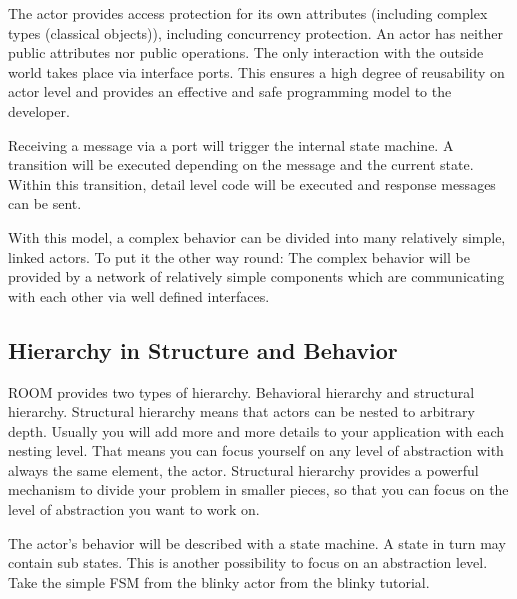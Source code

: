 
The actor provides access protection for its own attributes (including complex types (classical objects)), 
including concurrency protection. An actor has neither public attributes nor public operations. The only 
interaction with the outside world takes place via interface ports. This ensures a high degree of 
reusability on actor level and provides an effective and safe programming model to the developer. 

Receiving a message via a port will trigger the internal state machine. A transition will be executed 
depending on the message and the current state. Within this transition, detail level code will be executed 
and response messages can be sent.


With this model, a complex behavior can be divided into many relatively simple, linked actors. To put it the 
other way round: The complex behavior will be provided by a network of relatively simple components which 
are communicating with each other via well defined interfaces.


\subsection{Hierarchy in Structure and Behavior}

ROOM provides two types of hierarchy. Behavioral hierarchy and structural hierarchy. Structural hierarchy 
means that actors can be nested to arbitrary depth. Usually you will add more and more details to your 
application with each nesting level. That means you can focus yourself on any level of abstraction with 
always the same element, the actor. Structural hierarchy provides a powerful mechanism to divide your 
problem in smaller pieces, so that you can focus on the level of abstraction you want to work on. 

The actor's behavior will be described with a state machine. A state in turn may contain sub states. This 
is another possibility to focus on an abstraction level. Take the simple FSM from the blinky actor from 
the blinky tutorial. 
   
